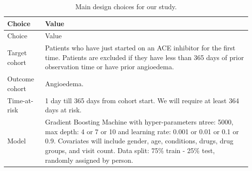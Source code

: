 \documentclass[11pt]{book}
\theoremstyle{definition}
\theoremstyle{definition}
\theoremstyle{definition}
\theoremstyle{remark}
\begin{document}
\begin{longtable}[]{@{}ll@{}}
\caption{\label{tab:plpSummary} Main design choices for our study.}\tabularnewline
\toprule
\begin{minipage}[b]{0.23\columnwidth}\raggedright
Choice\strut
\end{minipage} & \begin{minipage}[b]{0.72\columnwidth}\raggedright
Value\strut
\end{minipage}\tabularnewline
\midrule
\endfirsthead
\toprule
\begin{minipage}[b]{0.23\columnwidth}\raggedright
Choice\strut
\end{minipage} & \begin{minipage}[b]{0.72\columnwidth}\raggedright
Value\strut
\end{minipage}\tabularnewline
\midrule
\endhead
\begin{minipage}[t]{0.23\columnwidth}\raggedright
Target cohort\strut
\end{minipage} & \begin{minipage}[t]{0.72\columnwidth}\raggedright
Patients who have just started on an ACE inhibitor for the first time. Patients are excluded if they have less than 365 days of prior observation time or have prior angioedema.\strut
\end{minipage}\tabularnewline
\begin{minipage}[t]{0.23\columnwidth}\raggedright
Outcome cohort\strut
\end{minipage} & \begin{minipage}[t]{0.72\columnwidth}\raggedright
Angioedema.\strut
\end{minipage}\tabularnewline
\begin{minipage}[t]{0.23\columnwidth}\raggedright
Time-at-risk\strut
\end{minipage} & \begin{minipage}[t]{0.72\columnwidth}\raggedright
1 day till 365 days from cohort start. We will require at least 364 days at risk.\strut
\end{minipage}\tabularnewline
\begin{minipage}[t]{0.23\columnwidth}\raggedright
Model\strut
\end{minipage} & \begin{minipage}[t]{0.72\columnwidth}\raggedright
Gradient Boosting Machine with hyper-parameters ntree: 5000, max depth: 4 or 7 or 10 and learning rate: 0.001 or 0.01 or 0.1 or 0.9. Covariates will include gender, age, conditions, drugs, drug groups, and visit count. Data split: 75\% train - 25\% test, randomly assigned by person.\strut
\end{minipage}\tabularnewline
\bottomrule
\end{longtable}
\end{document}

